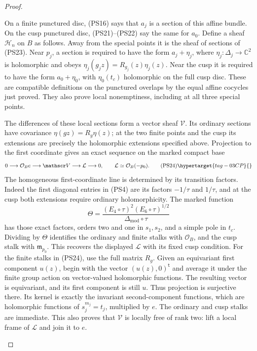 \begin{proof}
\begin{enumerate}[label=\arabic*.,leftmargin=*]
On a finite punctured disc, (PS16) says that $a_j$ is a section of
this affine bundle. On the cusp punctured disc, (PS21)--(PS22) say
the same for $a_0$. Define a sheaf $\mathscr H_n$ on $B$ as follows.
Away from the special points it is the sheaf of sections of (PS23).
Near $p_j$, a section is required to have the form $a_j+\eta_j$,
where $\eta_j:\Delta_j\to\mathbb C^2$ is holomorphic and obeys
$\eta_j(g_jz)=R_{g_j}(z)\eta_j(z)$. Near the cusp it is required
to have the form $a_0+\eta_0$, with $\eta_0(t_c)$ holomorphic on
the full cusp disc. These are compatible definitions on the punctured
overlaps by the equal affine cocycles just proved. They also prove
local nonemptiness, including at all three special points.

The differences of these local sections form a vector sheaf
$\mathscr V$. Its ordinary sections have covariance $\eta(gz)=R_g\eta(z)$;
at the two finite points and the cusp its extensions are precisely
the holomorphic extensions specified above. Projection to the first
coordinate gives an exact sequence on the marked compact base
\[
 0\longrightarrow\mathcal O_B e\longrightarrow\mathscr V
        \longrightarrow\mathcal L\longrightarrow0,
                  \qquad \mathcal L\simeq\mathcal O_B(-p_0).
 \tag{PS24}\hypertarget{tag-03CP}{}\label{wb:pshift:eq:vector-sheaf}
\]
The homogeneous first-coordinate line is determined by its transition factors. Indeed
the first diagonal entries in (PS4) are its factors $-1/\tau$ and
$1/\tau$, and at the cusp both extensions require ordinary
holomorphicity. The marked function
\[
 \Theta=\frac{(E_4\circ\tau)^2(E_6\circ\tau)^{1/2}}
                 {\Delta_{\mathrm{mod}}\circ\tau}
\]
has those exact factors, orders two and one in $s_1,s_2$, and a
simple pole in $t_c$. Dividing by $\Theta$ identifies the ordinary
and finite stalks with $\mathcal O_B$, and the cusp stalk with
$\mathfrak m_{p_0}$. This recovers the displayed $\mathcal L$
with its fixed cusp condition. 
For the finite stalks in (PS24), use the full matrix $R_g$. Given an equivariant first component
$u(z)$, begin with the vector $(u(z),0)^{\mathsf t}$ and average it
under the finite group action on vector-valued holomorphic functions.
The resulting vector is equivariant, and its first component is
still $u$. Thus projection is surjective there. Its kernel is
exactly the invariant second-component functions, which are
holomorphic functions of $s_j^{m_j}=t_j$, multiplied by $e$.
The ordinary and cusp stalks are immediate. This also proves that
$\mathscr V$ is locally free of rank two: lift a local frame of
$\mathcal L$ and join it to $e$.


\end{enumerate}
\end{proof}
